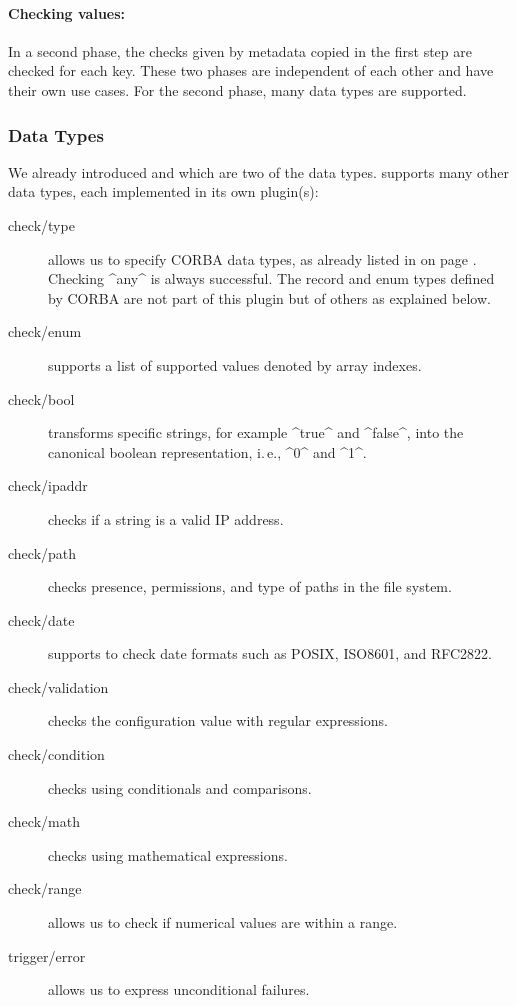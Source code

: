 \paragraph{Checking values:}
In a second phase, the checks given by metadata copied in the first step are checked for each key.
These two phases are independent of each other and have their own use cases.
For the second phase, many data types are supported.

\subsubsection{Data Types}
\label{sec:data-types}

We already introduced  and  which are two of the data types.
\elektra{} supports many other data types, each implemented in its own plugin(s):
\begin{description}
\item [check/type] allows us to specify CORBA data types, as already listed in  on page \pageref{ex:types}.
Checking ^any^ is always successful.
The record and enum types defined by CORBA are not part of this plugin but of others as explained below.

\item [check/enum] supports a list of supported values denoted by array indexes.
\item [check/bool] transforms specific strings, for example ^true^ and ^false^, into the canonical boolean representation, i.\,e., ^0^ and ^1^.
\item [check/ipaddr] checks if a string is a valid IP address.
\item [check/path] checks presence, permissions, and type of paths in the file system.
\item [check/date] supports to check date formats such as POSIX, ISO8601, and RFC2822.
\item [check/validation] checks the configuration value with regular expressions.
\item [check/condition] checks using conditionals and comparisons.
\item [check/math] checks using mathematical expressions.
\item [check/range] allows us to check if numerical values are within a range.
\item [trigger/error] allows us to express unconditional failures.
\end{description}

